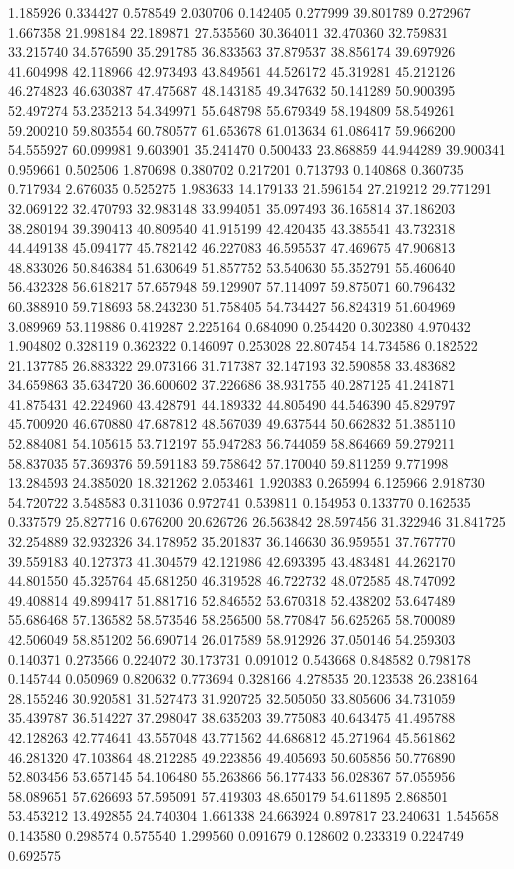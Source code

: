1.185926
0.334427
0.578549
2.030706
0.142405
0.277999
39.801789
0.272967
1.667358
21.998184
22.189871
27.535560
30.364011
32.470360
32.759831
33.215740
34.576590
35.291785
36.833563
37.879537
38.856174
39.697926
41.604998
42.118966
42.973493
43.849561
44.526172
45.319281
45.212126
46.274823
46.630387
47.475687
48.143185
49.347632
50.141289
50.900395
52.497274
53.235213
54.349971
55.648798
55.679349
58.194809
58.549261
59.200210
59.803554
60.780577
61.653678
61.013634
61.086417
59.966200
54.555927
60.099981
9.603901
35.241470
0.500433
23.868859
44.944289
39.900341
0.959661
0.502506
1.870698
0.380702
0.217201
0.713793
0.140868
0.360735
0.717934
2.676035
0.525275
1.983633
14.179133
21.596154
27.219212
29.771291
32.069122
32.470793
32.983148
33.994051
35.097493
36.165814
37.186203
38.280194
39.390413
40.809540
41.915199
42.420435
43.385541
43.732318
44.449138
45.094177
45.782142
46.227083
46.595537
47.469675
47.906813
48.833026
50.846384
51.630649
51.857752
53.540630
55.352791
55.460640
56.432328
56.618217
57.657948
59.129907
57.114097
59.875071
60.796432
60.388910
59.718693
58.243230
51.758405
54.734427
56.824319
51.604969
3.089969
53.119886
0.419287
2.225164
0.684090
0.254420
0.302380
4.970432
1.904802
0.328119
0.362322
0.146097
0.253028
22.807454
14.734586
0.182522
21.137785
26.883322
29.073166
31.717387
32.147193
32.590858
33.483682
34.659863
35.634720
36.600602
37.226686
38.931755
40.287125
41.241871
41.875431
42.224960
43.428791
44.189332
44.805490
44.546390
45.829797
45.700920
46.670880
47.687812
48.567039
49.637544
50.662832
51.385110
52.884081
54.105615
53.712197
55.947283
56.744059
58.864669
59.279211
58.837035
57.369376
59.591183
59.758642
57.170040
59.811259
9.771998
13.284593
24.385020
18.321262
2.053461
1.920383
0.265994
6.125966
2.918730
54.720722
3.548583
0.311036
0.972741
0.539811
0.154953
0.133770
0.162535
0.337579
25.827716
0.676200
20.626726
26.563842
28.597456
31.322946
31.841725
32.254889
32.932326
34.178952
35.201837
36.146630
36.959551
37.767770
39.559183
40.127373
41.304579
42.121986
42.693395
43.483481
44.262170
44.801550
45.325764
45.681250
46.319528
46.722732
48.072585
48.747092
49.408814
49.899417
51.881716
52.846552
53.670318
52.438202
53.647489
55.686468
57.136582
58.573546
58.256500
58.770847
56.625265
58.700089
42.506049
58.851202
56.690714
26.017589
58.912926
37.050146
54.259303
0.140371
0.273566
0.224072
30.173731
0.091012
0.543668
0.848582
0.798178
0.145744
0.050969
0.820632
0.773694
0.328166
4.278535
20.123538
26.238164
28.155246
30.920581
31.527473
31.920725
32.505050
33.805606
34.731059
35.439787
36.514227
37.298047
38.635203
39.775083
40.643475
41.495788
42.128263
42.774641
43.557048
43.771562
44.686812
45.271964
45.561862
46.281320
47.103864
48.212285
49.223856
49.405693
50.605856
50.776890
52.803456
53.657145
54.106480
55.263866
56.177433
56.028367
57.055956
58.089651
57.626693
57.595091
57.419303
48.650179
54.611895
2.868501
53.453212
13.492855
24.740304
1.661338
24.663924
0.897817
23.240631
1.545658
0.143580
0.298574
0.575540
1.299560
0.091679
0.128602
0.233319
0.224749
0.692575
